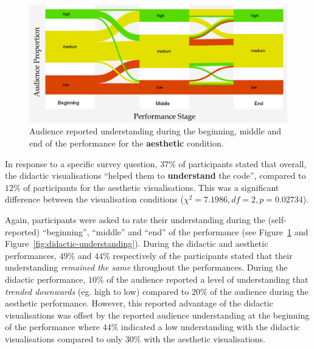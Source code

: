 \begin{figure}
  \centering
  \includegraphics[width=\columnwidth]{../study-2/results/graphs/aesthetic-understanding-final}
  \caption{Audience reported understanding during the beginning, middle
    and end of the performance for the \textbf{aesthetic} condition.}
  \label{fig:aesthetic-understanding}
\end{figure}


In response to a specific survey question, $37\%$ of participants
stated that overall, the didactic visualisations ``helped them to
\textbf{understand} the code'', compared to $12\%$ of participants for the
aesthetic visualisations. This was a significant difference between
the visualisation conditions ($\chi^2=7.1986,df=2,p=0.02734$).

Again, participants were asked to rate their understanding during the
(self-reported) ``beginning'', ``middle'' and ``end'' of the
performance (see Figure~\ref{fig:aesthetic-understanding} and
Figure~\ref{fig:didactic-understanding}). During the didactic and
aesthetic performances, $49\%$ and $44\%$ respectively of the
participants stated that their understanding \emph{remained the same}
throughout the performances. During the didactic performance, $10\%$
of the audience reported a level of understanding that \emph{trended
  downwards} (eg. high to low) compared to $20\%$ of the audience
during the aesthetic performance. However, this reported advantage of
the didactic visualisations was offset by the reported audience
understanding at the beginning of the performance where $44\%$
indicated a low understanding with the didactic visualisations
compared to only $30\%$ with the aesthetic visualisations. 

